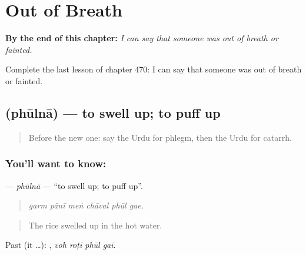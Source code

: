 
\chapter{Out of Breath}
\label{ch:ur-out-of-breath}

\begin{chapteropening}
\textbf{By the end of this chapter:} \emph{I can say that someone was out of breath or fainted.}

Complete the last lesson of chapter 470: I can say that someone was out of breath or fainted.
\end{chapteropening}

\section[\texorpdfstring{\ur{پھولنا} (phūlnā)}{پھولنا (phūlnā)}]{ (phūlnā) — to swell up; to puff up}

\label{lesson:UR-C470-phulna}



\begin{quote}
Before the new one: say the Urdu for phlegm, then the Urdu for catarrh.
\end{quote}

\subsection*{You'll want to know: }
\textbf{} — \emph{phūlnā} — \textquotedblleft{}to swell up; to puff up\textquotedblright{}.

\begin{quote}
     
\end{quote}

\begin{quote}
\emph{garm pānī meṅ chāval phūl gae.}
\end{quote}

\begin{quote}
The rice swelled up in the hot water.
\end{quote}

Past (it …):    , \emph{voh roṭī phūl gaī}.

